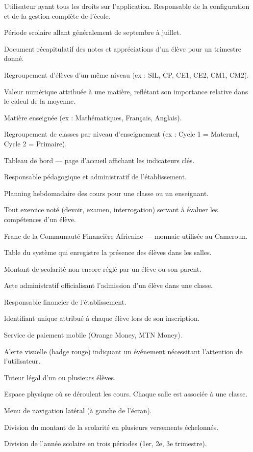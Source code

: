 \documentclass[12pt, a4paper, twoside, openright]{report}
\begin{document}
\begin{description}[style=nextline, leftmargin=3cm, font=\bfseries\color{brandBlue}]
  \item[Administrateur] Utilisateur ayant tous les droits sur l'application. Responsable de la configuration et de la gestion complète de l'école.
  \item[Année académique] Période scolaire allant généralement de septembre à juillet.
  \item[Bulletin] Document récapitulatif des notes et appréciations d'un élève pour un trimestre donné.
  \item[Classe] Regroupement d'élèves d'un même niveau (ex : SIL, CP, CE1, CE2, CM1, CM2).
  \item[Coefficient] Valeur numérique attribuée à une matière, reflétant son importance relative dans le calcul de la moyenne.
  \item[Cours] Matière enseignée (ex : Mathématiques, Français, Anglais).
  \item[Cycle] Regroupement de classes par niveau d'enseignement (ex : Cycle 1 = Maternel, Cycle 2 = Primaire).
  \item[Dashboard] Tableau de bord — page d'accueil affichant les indicateurs clés.
  \item[Directeur] Responsable pédagogique et administratif de l'établissement.
  \item[Emploi du temps] Planning hebdomadaire des cours pour une classe ou un enseignant.
  \item[Évaluation] Tout exercice noté (devoir, examen, interrogation) servant à évaluer les compétences d'un élève.
  \item[FCFA] Franc de la Communauté Financière Africaine — monnaie utilisée au Cameroun.
  \item[Fréquentation] Table du système qui enregistre la présence des élèves dans les salles.
  \item[Impayé] Montant de scolarité non encore réglé par un élève ou son parent.
  \item[Inscription] Acte administratif officialisant l'admission d'un élève dans une classe.
  \item[Intendant] Responsable financier de l'établissement.
  \item[Matricule] Identifiant unique attribué à chaque élève lors de son inscription.
  \item[Mobile Money] Service de paiement mobile (Orange Money, MTN Money).
  \item[Notification] Alerte visuelle (badge rouge) indiquant un événement nécessitant l'attention de l'utilisateur.
  \item[Parent] Tuteur légal d'un ou plusieurs élèves.
  \item[Salle] Espace physique où se déroulent les cours. Chaque salle est associée à une classe.
  \item[Sidebar] Menu de navigation latéral (à gauche de l'écran).
  \item[Tranche] Division du montant de la scolarité en plusieurs versements échelonnés.
  \item[Trimestre] Division de l'année scolaire en trois périodes (1er, 2e, 3e trimestre).
\end{description}
\end{document}

